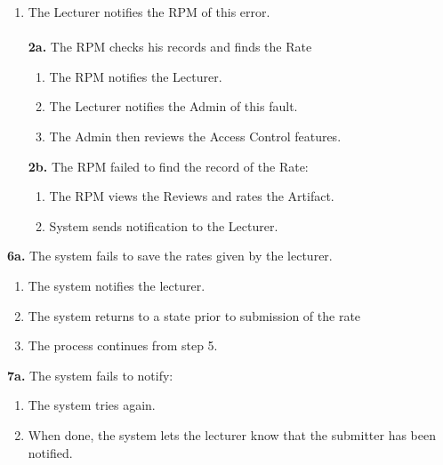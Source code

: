      \begin{enumerate}
              \itemsep-1em 
            \item The Lecturer notifies the RPM of this error.
            \\
            \\
           \textbf{ 2a.} The RPM checks his records and finds the Rate
            \begin{enumerate}
            \itemsep-1em 
                \item The RPM notifies the Lecturer.
                \item The Lecturer notifies the Admin of this fault.
                \item The Admin then reviews the Access Control features.
            \end{enumerate}
           
           \textbf{ 2b.} The RPM failed to find the record of the Rate:
            \begin{enumerate}
            \itemsep-1em 
                \item The RPM views the Reviews and rates the Artifact.
                \item System sends notification to the Lecturer.
            \end{enumerate}
        \end{enumerate}
        
        \textbf{6a.} The system fails to save the rates given by the lecturer.
        \begin{enumerate}
            \itemsep-1em 
                \item The system notifies the lecturer.
                \item The system returns to a state prior to submission of the rate
                \item The process continues from step 5.
            \end{enumerate}
        
        \textbf{7a.} The system fails to notify:
        \begin{enumerate}
            \itemsep-1em 
                \item The system tries again.
                \item When done, the system lets the lecturer know that the submitter has been notified.
            \end{enumerate}
            
        
        


